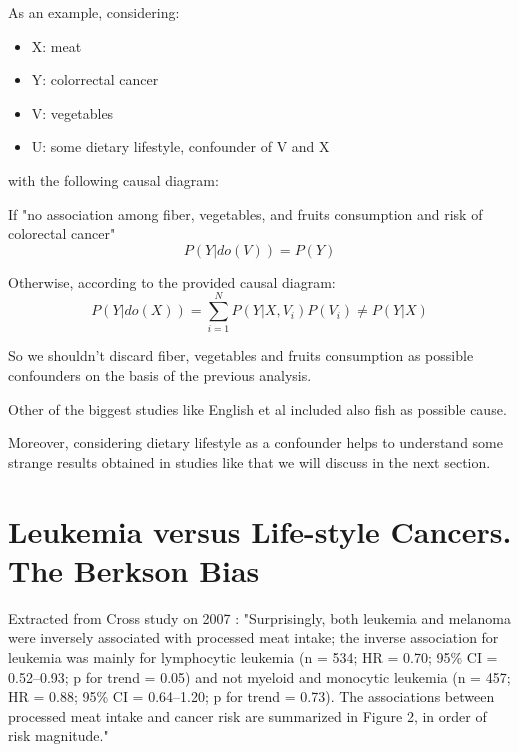 \documentclass{article}
\begin{document}
As an example, considering:

\begin{itemize}
\item X: meat
\item Y: colorrectal cancer
\item V: vegetables
\item U: some dietary lifestyle, confounder of V and X
\end{itemize}

with the following causal diagram:


If "no association among fiber, vegetables, and fruits consumption and risk of colorectal cancer"
\begin{equation}
  P(Y|do(V))=P(Y)
\end{equation}

Otherwise, according to the provided causal diagram:
\begin{equation}
P(Y|do(X))=\sum _{i=1}^{N} P(Y|X,V_i)P(V_i) \neq P (Y|X)
\end{equation}


So we shouldn't discard fiber, vegetables and fruits consumption as possible confounders on the basis of the previous analysis.

Other of the biggest studies like English et al \cite{english} included also fish as possible cause.

Moreover, considering dietary lifestyle as a confounder helps to understand some strange results obtained in studies like \cite{cross} that we will discuss in the next section.

\section{Leukemia versus Life-style Cancers. The Berkson Bias}
\label{sec:cross}

Extracted from Cross study on 2007 \cite{cross}: "Surprisingly, both leukemia and melanoma were inversely associated with processed meat intake; the inverse association for leukemia was mainly for lymphocytic leukemia (n = 534; HR = 0.70; 95\% CI = 0.52–0.93; p for trend = 0.05) and not myeloid and monocytic leukemia (n = 457; HR = 0.88; 95\% CI = 0.64–1.20; p for trend = 0.73). The associations between processed meat intake and cancer risk are summarized in Figure 2, in order of risk magnitude."
\end{document}
